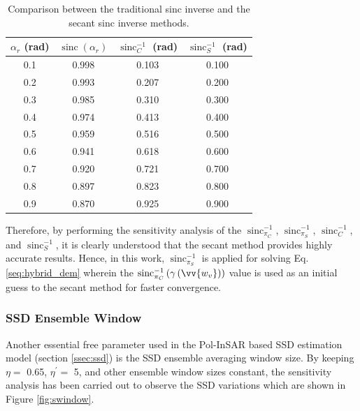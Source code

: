 \documentclass[12pt]{elsarticle}
\numberwithin{equation}{section}
\numberwithin{figure}{section}
\numberwithin{table}{section}
\DeclareMathOperator{\sinc}{sinc}
\begin{document}
\begin{table}[ht]
\centering
\caption{Comparison between the traditional \cite{Cloude2010} sinc inverse and the secant sinc inverse methods.}
\label{table:3}
\begin{tabular}{c c c c}
\hline
\boldmath$\alpha_r$ \textbf{(rad)} & \boldmath$\sinc\left(\alpha_r\right)$   & \boldmath$\sinc_C^{-1}$ \textbf{(rad)}     & \boldmath$\sinc_S^{-1}$ \textbf{(rad)} \\ \hline
0.1                 & 0.998            & 0.103          & 0.100  \\ 
0.2                 & 0.993            & 0.207          & 0.200  \\ 
0.3                 & 0.985            & 0.310          & 0.300  \\ 
0.4                 & 0.974            & 0.413          & 0.400  \\ 
0.5                 & 0.959            & 0.516          & 0.500   \\ 
0.6                 & 0.941            & 0.618          & 0.600  \\ 
0.7                 & 0.920            & 0.721          & 0.700   \\ 
0.8                 & 0.897            & 0.823          & 0.800 \\ 
0.9                 & 0.870            & 0.925          & 0.900 \\ \hline

\end{tabular}
\end{table}

Therefore, by performing the sensitivity analysis of the $\sinc_{\pi_C}^{-1}$, $\sinc_{\pi_S}^{-1}$, $\sinc_C^{-1}$, and $\sinc_S^{-1}$, it is clearly understood that the secant method provides highly accurate results. Hence, in this work, $\sinc_{\pi_S}^{-1}$ is applied for solving Eq. \eqref{seq:hybrid_dem} wherein the $\sinc_{\pi_C}^{-1}\left(\gamma\left(\vv{w_v}\right)\right)$ value is used as an initial guess to the secant method for faster convergence.

\subsubsection{SSD Ensemble Window}

Another essential free parameter used in the Pol-InSAR based SSD estimation model (section \ref{ssec:ssd}) is the SSD ensemble averaging window size. By keeping $\eta = $ 0.65, $\eta^\prime = $ 5, and other ensemble window sizes constant, the sensitivity analysis has been carried out to observe the SSD variations which are shown in Figure \ref{fig:swindow}. 
\end{document}
